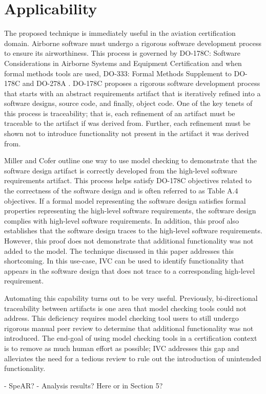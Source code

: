 \section{Applicability}
\label{sec:applicability}

The proposed technique is immediately useful in the aviation certification domain. Airborne software must undergo a rigorous software development process to ensure its airworthiness. This process is governed by DO-178C: Software Considerations in Airborne Systems and Equipment Certification \cite{DO-178C} and when formal methods tools are used, DO-333: Formal Methods Supplement to DO-178C and DO-278A \cite{DO-333}. DO-178C proposes a rigorous software development process that starts with an abstract requirements artifact that is iteratively refined into a software designs, source code, and finally, object code. One of the key tenets of this process is traceability; that is, each refinement of an artifact must be traceable to the artifact if was derived from. Further, each refinement must be shown not to introduce functionality not present in the artifact it was derived from.

Miller and Cofer \cite{FMCaseStudy} outline one way to use model checking to demonstrate that the software design artifact is correctly developed from the high-level software requirements artifact. This process helps satisfy DO-178C objectives related to the correctness of the software design and is often referred to as Table A.4 objectives. If a formal model representing the software design satisfies formal properties representing the high-level software requirements, the software design complies with high-level software requirements. In addition, this proof also establishes that the software design traces to the high-level software requirements. However, this proof does not demonstrate that additional functionality was not added to the model. The technique discussed in this paper addresses this shortcoming. In this use-case, IVC can be used to identify functionality that appears in the software design that does not trace to a corresponding high-level requirement.

Automating this capability turns out to be very useful. Previously, bi-directional traceability between artifacts is one area that model checking tools could not address. This deficiency requires model checking tool users to still undergo rigorous manual peer review to determine that additional functionality was not introduced. The end-goal of using model checking tools in a certification context is to remove as much human effort as possible; IVC addresses this gap and alleviates the need for a tedious review to rule out the introduction of unintended functionality.

- SpeAR? \cite{}
- Analysis results? Here or in Section 5?
